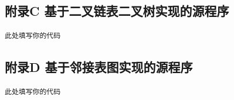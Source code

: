 \documentclass[supercite]{HustGraduPaper}
\theoremstyle{definition}
\begin{document}
    \subsection{附录C 基于二叉链表二叉树实现的源程序}\label{sec:附录c-基于二叉链表二叉树实现的源程序}
    \begin{lstlisting}[caption={二叉树},style=二叉树,title=二叉树]
	此处填写你的代码
    \end{lstlisting}
    \newpage


    \subsection{附录D 基于邻接表图实现的源程序}\label{sec:附录d-基于邻接表图实现的源程序}
    \begin{lstlisting}[caption=邻接表图,style=邻接表图,title=邻接表图]
	此处填写你的代码
    \end{lstlisting}
\end{document}
